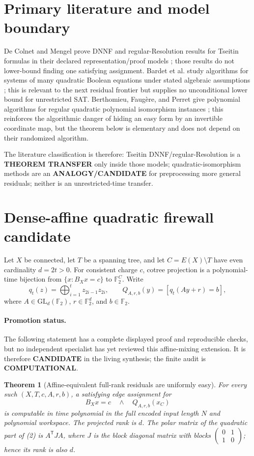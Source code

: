 \documentclass[11pt]{article}
\newtheorem{theorem}{Theorem}
\newcommand{\F}{\mathbb F_2}
\newcommand{\COMP}{\textbf{COMPUTATIONAL}}
\newcommand{\CAND}{\textbf{CANDIDATE}}
\begin{document}
\section{Primary literature and model boundary}
De Colnet and Mengel prove DNNF and regular-Resolution results for Tseitin
formulas in their declared representation/proof models \cite{dcm}; those
results do not lower-bound finding one satisfying assignment.  Bardet et al.
study algorithms for systems of many quadratic Boolean equations under stated
algebraic assumptions \cite{bardet}; this is relevant to the next residual
frontier but supplies no unconditional lower bound for unrestricted SAT.
Berthomieu, Faug\`ere, and Perret give polynomial algorithms for regular
quadratic polynomial isomorphism instances \cite{bfp}; this reinforces the
algorithmic danger of hiding an easy form by an invertible coordinate map, but
the theorem below is elementary and does not depend on their randomized
algorithm.

The literature classification is therefore: Tseitin DNNF/regular-Resolution is
a \textbf{THEOREM TRANSFER} only inside those models; quadratic-isomorphism
methods are an \textbf{ANALOGY/CANDIDATE} for preprocessing more general
residuals; neither is an unrestricted-time transfer.

\section{Dense-affine quadratic firewall candidate}
Let $X$ be connected, let $T$ be a spanning tree, and let
$C=E(X)\setminus T$ have even cardinality $d=2t>0$.  For consistent charge
$c$, cotree projection is a polynomial-time bijection from
$\{x:B_Xx=c\}$ to $\F^C$.  Write
\[
 q_t(z)=\bigoplus_{i=1}^{t}z_{2i-1}z_{2i},
 \qquad
 Q_{A,r,b}(y)=[q_t(Ay+r)=b],                              \tag{2}
\]
where $A\in\mathrm{GL}_d(\F)$, $r\in\F^d$, and $b\in\F$.

\paragraph{Promotion status.}
The following statement has a complete displayed proof and reproducible
checks, but no independent specialist has yet reviewed this affine-mixing
extension.  It is therefore \CAND{} in the living synthesis; the finite audit
is \COMP{}.

\begin{theorem}[Affine-equivalent full-rank residuals are uniformly easy]
For every such $(X,T,c,A,r,b)$, a satisfying edge assignment for
\[
 B_Xx=c\quad\land\quad Q_{A,r,b}(x_C)                    \tag{3}
\]
is computable in time polynomial in the full encoded input length $N$ and
polynomial workspace.  The projected rank is $d$.  The polar matrix of the
quadratic part of (2) is $A^{\mathsf T}JA$, where $J$ is the block diagonal
matrix with blocks $\left(\begin{smallmatrix}0&1\\1&0\end{smallmatrix}\right)$;
hence its rank is also $d$.
\end{theorem}
\end{document}

